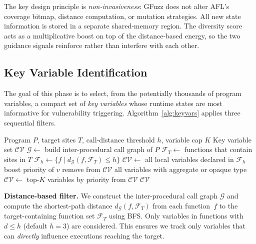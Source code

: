 \documentclass[preprint,12pt,3p]{elsarticle}
\begin{document}
The key design principle is \emph{non-invasiveness}: GFuzz does not alter
AFL's coverage bitmap, distance computation, or mutation strategies.  All new
state information is stored in a separate shared-memory region.  The
diversity score acts as a multiplicative boost on top of the distance-based
energy, so the two guidance signals reinforce rather than interfere with each
other.

\subsection{Key Variable Identification}
\label{sec:keyvars}

The goal of this phase is to select, from the potentially thousands of program
variables, a compact set of \emph{key variables} whose runtime states are most
informative for vulnerability triggering.  Algorithm~\ref{alg:keyvars} applies
three sequential filters.

\begin{algorithm}[t]
\caption{Key Variable Identification}
\label{alg:keyvars}
\begin{algorithmic}[1]
\Require Program $P$, target sites $T$, call-distance threshold $h$,
         variable cap $K$
\Ensure Key variable set $\mathcal{CV}$
\State $\mathcal{G} \leftarrow$ build inter-procedural call graph of $P$
\State $\mathcal{F}_T \leftarrow$ functions that contain sites in $T$
\State $\mathcal{F}_{h} \leftarrow \{f \mid d_{\mathcal{G}}(f,\mathcal{F}_T) \leq h\}$
\State $\mathcal{CV} \leftarrow$ all local variables declared in $\mathcal{F}_{h}$
    \State boost priority of $v$
  \EndIf
\EndFor
\State remove from $\mathcal{CV}$ all variables with aggregate or
       opaque type
\State $\mathcal{CV} \leftarrow$ top-$K$ variables by priority from $\mathcal{CV}$
\State \Return $\mathcal{CV}$
\end{algorithmic}
\end{algorithm}

\textbf{Distance-based filter.}  We construct the inter-procedural call graph
$\mathcal{G}$ and compute the shortest-path distance $d_{\mathcal{G}}(f,
\mathcal{F}_T)$ from each function~$f$ to the target-containing function
set $\mathcal{F}_T$ using BFS.  Only variables in functions with $d \leq h$
(default $h=3$) are considered.  This ensures we track only variables that can
\emph{directly} influence executions reaching the target.
\end{document}
